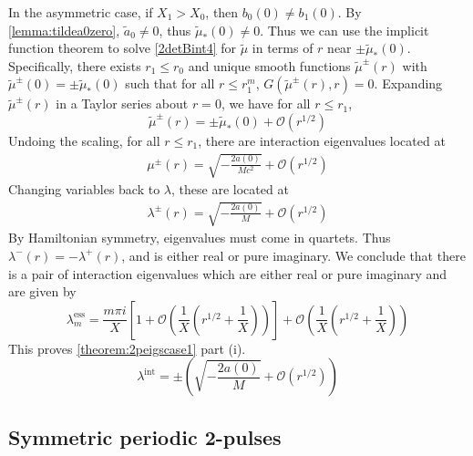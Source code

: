 \documentclass[thesis.tex]{subfiles}
\begin{document}
In the asymmetric case, if $X_1 > X_0$, then $b_0(0) \neq b_1(0)$. By \cref{lemma:tildea0zero}, $\tilde{a}_0 \neq 0$, thus $\tilde{\mu}_*(0) \neq 0$. Thus we can use the implicit function theorem to solve \cref{2detBint4} for $\tilde{\mu}$ in terms of $r$ near $\pm \tilde{\mu}_*(0)$. Specifically, there exists $r_1 \leq r_0$ and unique smooth functions $\tilde{\mu}^\pm(r)$ with $\tilde{\mu}^\pm(0) = \pm \tilde{\mu}_*(0)$ such that for all $r \leq r_1^m$, $G(\tilde{\mu}^\pm(r), r) = 0$. Expanding $\tilde{\mu}^\pm(r)$ in a Taylor series about $r = 0$, we have
for all $r \leq r_1$,
\[
\tilde{\mu}^\pm(r) = \pm \tilde{\mu}_*(0) + \mathcal{O}( r^{1/2} )
\]
Undoing the scaling, for all $r \leq r_1$, there are interaction eigenvalues located at
\begin{align*}
\mu^\pm(r) = \sqrt{-\frac{2 a(0)}{M c^2}} + \mathcal{O}( r^{1/2} )
\end{align*}
Changing variables back to $\lambda$, these are located at
\begin{align*}
\lambda^\pm(r) = \sqrt{-\frac{2 a(0)}{M}} + \mathcal{O}( r^{1/2} )
\end{align*}
By Hamiltonian symmetry, eigenvalues must come in quartets. Thus $\lambda^-(r) = -\lambda^+(r)$, and is either real or pure imaginary. We conclude that there is a pair of interaction eigenvalues which are either real or pure imaginary and are given by
\[
\lambda_m^{\text{ess}} = \frac{m \pi i}{X}\left[1 + \mathcal{O}\left( \frac{1}{X}\left( r^{1/2} + \frac{1}{X} \right) \right) \right] + \mathcal{O}\left( \frac{1}{X}\left( r^{1/2} + \frac{1}{X} \right) \right)
\]
This proves \cref{theorem:2peigscase1} part (i).
\[
\lambda^{\text{int}} = \pm \left( \sqrt{-\frac{2 a(0)}{M}} + \mathcal{O}( r^{1/2} ) \right)
\]

\subsection{Symmetric periodic 2-pulses}
\end{document}
